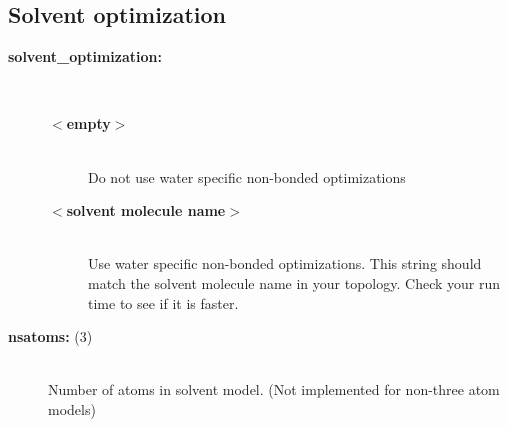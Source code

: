 \subsection{Solvent optimization}
\begin{description}
\item[{\bf solvent\_optimization:}]\mbox{}\\
\vspace{-2ex}\begin{description}
\item[{\bf $<$empty$>$}]\mbox{}\\
Do not use water specific non-bonded optimizations
\item[{\bf $<$solvent molecule name$>$}]\mbox{}\\
Use water specific non-bonded optimizations. This string should match the
solvent molecule name in your topology. Check your run time to see 
if it is faster. 
\end{description}
\item[{\bf nsatoms: }(3)]\mbox{}\\
Number of atoms in solvent model.
(Not implemented for non-three atom models)
\end{description}

